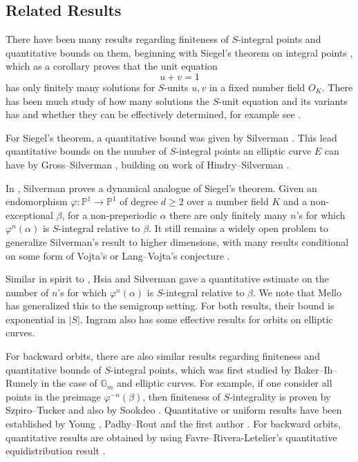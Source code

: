 \documentclass[10pt, reqno]{amsart}
\newcommand{\bb}{\mathbb}
\newcommand{\vphi}{\varphi}
\numberwithin{theorem}{section}
\numberwithin{equation}{section}
\numberwithin{example}{section}
\numberwithin{definition}{section}
\begin{document}
\subsection{Related Results} There have been many results regarding finiteness of $S$-integral points and quantitative bounds on them, beginning with Siegel's theorem on integral points \cite{Sie29}, which as a corollary proves that the unit equation
$$u+v = 1$$
has only finitely many solutions for $S$-units $u,v$ in a fixed number field $O_K$. There has been much study of how many solutions the $S$-unit equation and its variants has and whether they can be effectively determined, for example see \cite{Eve84, ESS02, EG15}.
\par 
For Siegel's theorem, a quantitative bound was given by Silverman \cite{Sil87b}. This lead quantitative bounds on the number of $S$-integral points an elliptic curve $E$ can have by Gross--Silverman \cite{GS95}, building on work of Hindry--Silverman \cite{HS88}.  
\par 
In \cite{Sil93}, Silverman proves a dynamical analogue of Siegel's theorem. Given an endomorphism $\vphi: \bb{P}^1 \to \bb{P}^1$ of degree $d \geq 2$ over a number field $K$ and a non-exceptional $\beta$, for a non-preperiodic $\alpha$ there are only finitely many $n$'s for which $\vphi^{n}(\alpha)$ is $S$-integral relative to $\beta$. It still remains a widely open problem to generalize Silverman's result to higher dimensions, with many results conditional on some form of Vojta's or Lang--Vojta's conjecture \cite{Yas14, CSTZ15, Yas15, LY19, Mat23, GN24, Mat24}. 
\par 
Similar in spirit to \cite{GS95}, Hsia and Silverman \cite{HS11} gave a quantitative estimate on the number of $n$'s for which $\vphi^n(\alpha)$ is $S$-integral relative to $\beta$. We note that Mello \cite{Mel19} has generalized this to the semigroup setting. For both results, their bound is exponential in $|S|$. Ingram \cite{Ing09} also has some effective results for orbits on elliptic curves.
\par 
For backward orbits, there are also similar results regarding finiteness and quantitative bounds of $S$-integral points, which was first studied by Baker--Ih--Rumely \cite{BIR08} in the case of $\bb{G}_m$ and elliptic curves. For example, if one consider all points in the preimage $\vphi^{-n}(\beta)$, then finiteness of $S$-integrality is proven by Szpiro--Tucker \cite{ST11} and also by Sookdeo \cite{Soo11}. Quantitative or uniform results have been established by Young \cite{You22}, Padhy--Rout \cite{PR24} and the first author \cite{Yap25}. For backward orbits, quantitative results are obtained by using Favre--Rivera-Letelier's quantitative equidistribution result \cite{FRL06}. 
\end{document}
